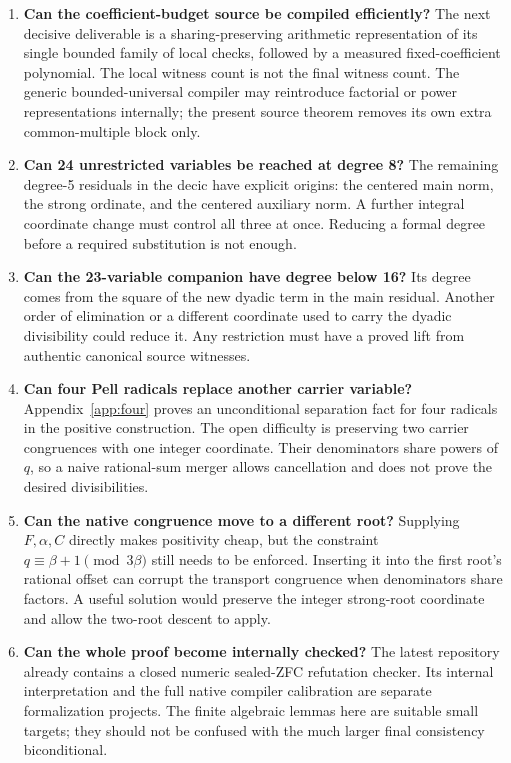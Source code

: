 \documentclass[11pt,letterpaper]{article}
\theoremstyle{definition}
\theoremstyle{remark}
\begin{document}
\begin{enumerate}
\item \textbf{Can the coefficient-budget source be compiled efficiently?}
The next decisive deliverable is a sharing-preserving arithmetic
representation of its single bounded family of local checks, followed by
a measured fixed-coefficient polynomial. The local witness count is not
the final witness count. The generic bounded-universal compiler may
reintroduce factorial or power representations internally; the present
source theorem removes its own extra common-multiple block only.

\item \textbf{Can 24 unrestricted variables be reached at degree 8?}
The remaining degree-5 residuals in the decic have explicit origins:
the centered main norm, the strong ordinate, and the centered auxiliary
norm. A further integral coordinate change must control all three at once.
Reducing a formal degree before a required substitution is not enough.

\item \textbf{Can the 23-variable companion have degree below 16?}
Its degree comes from the square of the new dyadic term in the main
residual. Another order of elimination or a different coordinate used to
carry the dyadic divisibility could reduce it. Any restriction must have
a proved lift from authentic canonical source witnesses.

\item \textbf{Can four Pell radicals replace another carrier variable?}
Appendix~\ref{app:four} proves an unconditional separation fact for four
radicals in the positive construction. The open difficulty is preserving
two carrier congruences with one integer coordinate. Their denominators
share powers of $q$, so a naive rational-sum merger allows cancellation
and does not prove the desired divisibilities.

\item \textbf{Can the native congruence move to a different root?}
Supplying $F,\alpha,C$ directly makes positivity cheap, but the constraint
$q\equiv\beta+1\pmod{3\beta}$ still needs to be enforced. Inserting it
into the first root's rational offset can corrupt the transport congruence
when denominators share factors. A useful solution would preserve the
integer strong-root coordinate and allow the two-root descent to apply.

\item \textbf{Can the whole proof become internally checked?}
The latest repository already contains a closed numeric sealed-ZFC
refutation checker. Its internal interpretation and the full native
compiler calibration are separate formalization projects. The finite
algebraic lemmas here are suitable small targets; they should not be
confused with the much larger final consistency biconditional.
\end{enumerate}
\end{document}

